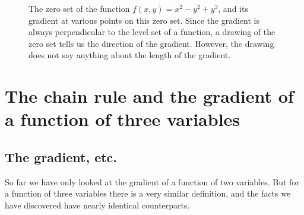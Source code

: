 \begin{figure}[ht]
  \begin{center}
    
  \end{center}
  \caption{The zero set of the function $f(x,y) = x^2-y^2+y^3$, and its gradient
    at various points on this zero set.  Since the gradient is always
    perpendicular to the level set of a function, a drawing of the zero set
    tells us the direction of the gradient.  However, the drawing does not say
    anything about the length of the gradient.}
  \label{fig:gradientANDlevels}
\end{figure}


\section{The chain rule and the gradient of a function of three variables}
\subsection{The gradient, etc.}
So far we have only looked at the gradient of a function of two variables.  But
for a function of three variables there is a very similar definition, and the
facts we have discovered have nearly identical counterparts.

